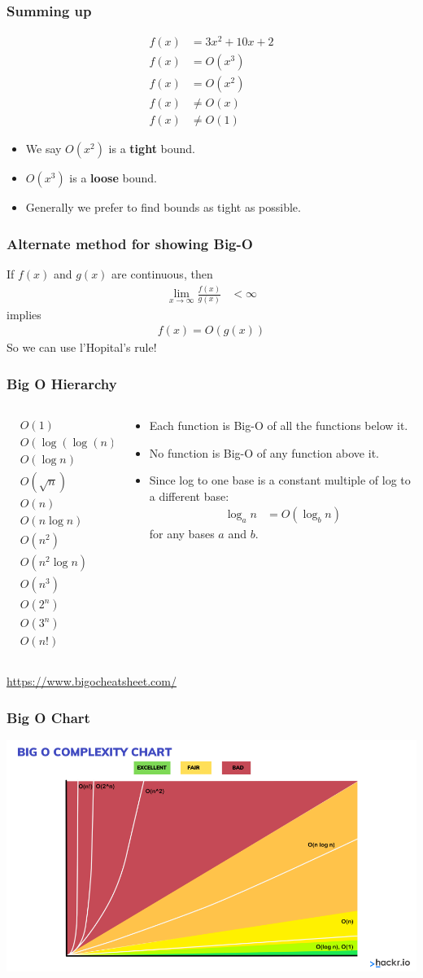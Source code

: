 \documentclass{beamer}
\newcommand{\bi}{\begin{itemize}}
\newcommand{\li}{\item}
\newcommand{\ei}{\end{itemize}}
\newcommand{\bfr}[1]{\begin{frame}[fragile]\frametitle{{ #1 }}}
\newcommand{\cola}{\begin{columns}\begin{column}{0.5\textwidth}}
\newcommand{\colb}{\end{column}\begin{column}{0.5\textwidth}}
\newcommand{\colc}{\end{column}\end{columns}}
\begin{document}
\bfr{Summing up}
\begin{align*}
f(x) &=  3x^2 + 10x + 2\\
f(x) &= O(x^3)\\
f(x) &= O(x^2)\\
f(x) &\not= O(x)\\
f(x) &\not=O(1)
\end{align*}
\bi
\li We say $O(x^2)$ is a {\bf tight} bound.
\li $O(x^3)$ is a {\bf loose} bound.
\li Generally we prefer to find bounds as tight
as possible.
\ei
\end{frame}

\bfr{Alternate method for showing Big-O}
If $f(x)$ and $g(x)$ are continuous, then
\begin{align*}
\lim_{x\rightarrow\infty} \frac{f(x)}{g(x)} &< \infty
\end{align*}
implies
\begin{align*}
f(x) = O(g(x))
\end{align*}
So we can use l'Hopital's rule!
\end{frame}

\bfr{Big O Hierarchy}
\cola
\begin{align*}
   & O(1) 
\\ & O(\log(\log(n)))
\\ & O(\log n)
\\ & O(\sqrt{n})
\\ & O(n)
\\ & O(n\log n)
\\ & O(n^2)
\\ & O(n^2\log n)
\\ & O(n^3)
\\ & O(2^n)
\\ & O(3^n)
\\ & O(n!)
\end{align*}
\colb
\bi
\li Each function is Big-O of all the functions below it.
\li No function is Big-O of any function above it.
\li   Since
log to one base is a constant multiple of log
to a different base:
\begin{align*}
\log_a n  &= O(\log_b n)
\end{align*}
for any bases $a$ and $b$.
\ei

\colc

\vfill

\centerline{\url{https://www.bigocheatsheet.com/}}
\end{frame}
\bfr{Big O Chart}
\includegraphics[width=\textwidth]{bigo}
\end{frame}
\end{document}
